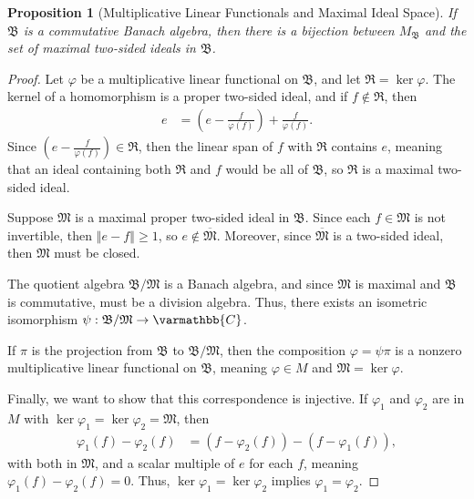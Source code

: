\documentclass[12pt]{extarticle}
\newcommand{\C}{\mathbb{C}}
\newcommand{\norm}[1]{\left\Vert #1\right\Vert}
\theoremstyle{plain}
\newtheorem*{proposition}{Proposition}
\theoremstyle{definition}
\theoremstyle{note}
\renewcommand*{\mathbb}[1]{\varmathbb{#1}}
\renewcommand{\newline}{\hfill\break}
\begin{document}
\begin{proposition}[Multiplicative Linear Functionals and Maximal Ideal Space]
  If $\mathfrak{B}$ is a commutative Banach algebra, then there is a bijection between $M_{\mathfrak{B}}$ and the set of maximal two-sided ideals in $\mathfrak{B}$.
\end{proposition}
\begin{proof}
  Let $\varphi$ be a multiplicative linear functional on $\mathfrak{B}$, and let $\mathfrak{R} =\ker\varphi$. The kernel of a homomorphism is a proper two-sided ideal, and if $f\notin \mathfrak{R}$, then
  \begin{align*}
    e &= \left(e - \frac{f}{\varphi(f)}\right) + \frac{f}{\varphi\left(f\right)}.
  \end{align*}
  Since $\left(e - \frac{f}{\varphi(f)}\right)\in \mathfrak{R}$, then the linear span of $f$ with $\mathfrak{R}$ contains $e$, meaning that an ideal containing both $\mathfrak{R}$ and $f$ would be all of $\mathfrak{B}$, so $\mathfrak{R}$ is a maximal two-sided ideal.\newline

  Suppose $\mathfrak{M}$ is a maximal proper two-sided ideal in $\mathfrak{B}$. Since each $f\in \mathfrak{M}$ is not invertible, then $\norm{e - f} \geq 1$, so $e\notin \overline{\mathfrak{M}}$. Moreover, since $\overline{\mathfrak{M}}$ is a two-sided ideal, then $\mathfrak{M}$ must be closed.\newline

  The quotient algebra $\mathfrak{B}/\mathfrak{M}$ is a Banach algebra, and since $\mathfrak{M}$ is maximal and $\mathfrak{B}$ is commutative, must be a division algebra. Thus, there exists an isometric isomorphism $\psi: \mathfrak{B}/\mathfrak{M}\rightarrow \C$.\newline

  If $\pi$ is the projection from $\mathfrak{B}$ to $\mathfrak{B}/\mathfrak{M}$, then the composition $\varphi = \psi \pi$ is a nonzero multiplicative linear functional on $\mathfrak{B}$, meaning $\varphi \in M$ and $\mathfrak{M} = \ker\varphi$.\newline

  Finally, we want to show that this correspondence is injective. If $\varphi_1$ and $\varphi_2$ are in $M$ with $\ker\varphi_1 = \ker\varphi_2 = \mathfrak{M}$, then
  \begin{align*}
    \varphi_1(f) - \varphi_2(f) &= \left(f - \varphi_2(f)\right) - \left(f - \varphi_1(f)\right),
  \end{align*}
  with both in $\mathfrak{M}$, and a scalar multiple of $e$ for each $f$, meaning $\varphi_1(f) - \varphi_2(f) = 0$. Thus, $\ker\varphi_1 = \ker\varphi_2 $ implies $\varphi_1 = \varphi_2$.
\end{proof}
\end{document}
